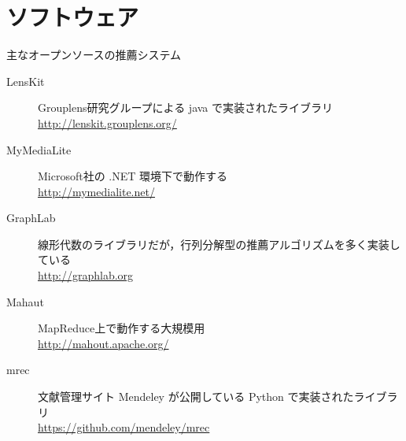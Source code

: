 \section{ソフトウェア}
\label{sec:reference-software}

主なオープンソースの推薦システム
\begin{description}
\item[LensKit]
Grouplens研究グループによる java で実装されたライブラリ\\
\url{http://lenskit.grouplens.org/}
\item[MyMediaLite]
Microsoft社の .NET 環境下で動作する\\
\url{http://mymedialite.net/}
\item[GraphLab]
線形代数のライブラリだが，行列分解型の推薦アルゴリズムを多く実装している\\
\url{http://graphlab.org}
\item[Mahaut] MapReduce上で動作する大規模用\\
\url{http://mahout.apache.org/}
\item[mrec] 文献管理サイト Mendeley が公開している Python で実装されたライブラリ\\
\url{https://github.com/mendeley/mrec}
\end{description}
